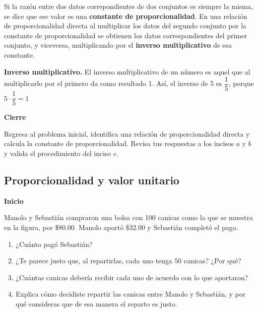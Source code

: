 \begin{boxH}
    Si la razón entre dos datos correpondientes de dos conjuntos es siempre la misma,
    se dice que ese valor es una \textbf{constante de proporcionalidad}. En una relación de
    proporcionalidad directa al multiplicar los datos del segundo conjunto por la constante
    de proporcionalidad se obtienen los datos correspondientes del primer conjunto, y
    viceversa, multiplicando por el \textbf{\color{cyan}inverso multiplicativo} de esa constante.
\end{boxH}

\begin{boxH}
    \textbf{\color{cyan}Inverso multiplicativo.}
    El inverso multiplicativo de un número es aquel que al
    multiplicarlo por el primero da como resultado 1.
    Así, el inverso de 5 es $\dfrac{1}{5}$, porque $5\cdot \dfrac{1}{5}=1$
\end{boxH}

\begin{boxK}
    \begin{center}\textbf{Cierre}\end{center}
    Regresa al problema inicial, identifica una relación de proporcionalidad directa y calcula
    la constante de proporcionalidad.
    Revisa tus respuestas a los incisos $a$ y $b$ y valida el procedimiento del inciso $c$.
\end{boxK}
\newpage
\subsection{Proporcionalidad y valor unitario}

\begin{boxK}
    \begin{center}\textbf{Inicio}\end{center}
    Manolo y Sebastián compraron una bolsa con 100 canicas como la que se muestra en la
    figura, por \$80.00. Manolo aportó \$32.00 y Sebastián completó el pago.
    \begin{enumerate}
        \item ¿Cuánto pagó Sebastián?
        \item ¿Te parece justo que, al repartirlas, cada uno tenga 50 canicas? ¿Por qué?
        \item ¿Cuántas canicas debería recibir cada uno de acuerdo con lo que aportaron?
        \item Explica cómo decidiste repartir las canicas entre Manolo y Sebastián, y por qué
              consideras que de esa manera el reparto es justo.
    \end{enumerate}
\end{boxK}

